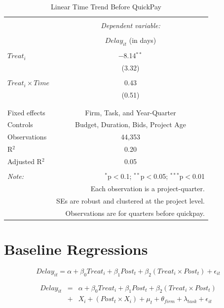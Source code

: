 \documentclass[
]{article}
\begin{document}
\begin{table}[H] \centering 
  \caption{Linear Time Trend Before QuickPay} 
  \label{} 
\small 
\begin{tabular}{@{\extracolsep{5pt}}lc} 
\\[-1.8ex]\hline 
\hline \\[-1.8ex] 
 & \multicolumn{1}{c}{\textit{Dependent variable:}} \\ 
\cline{2-2} 
\\[-1.8ex] & $Delay_{it}$ (in days) \\ 
\hline \\[-1.8ex] 
 $Treat_i$ & $-$8.14$^{**}$ \\ 
  & (3.32) \\ 
  & \\ 
 $Treat_i \times Time$ & 0.43 \\ 
  & (0.51) \\ 
  & \\ 
\hline \\[-1.8ex] 
Fixed effects & Firm, Task, and Year-Quarter \\ 
Controls & Budget, Duration, Bids, Project Age \\ 
Observations & 44,353 \\ 
R$^{2}$ & 0.20 \\ 
Adjusted R$^{2}$ & 0.05 \\ 
\hline 
\hline \\[-1.8ex] 
\textit{Note:}  & \multicolumn{1}{r}{$^{*}$p$<$0.1; $^{**}$p$<$0.05; $^{***}$p$<$0.01} \\ 
 & \multicolumn{1}{r}{Each observation is a project-quarter.} \\ 
 & \multicolumn{1}{r}{SEs are robust and clustered at the project level.} \\ 
 & \multicolumn{1}{r}{Observations are for quarters before quickpay.} \\ 
\end{tabular} 
\end{table}

\hypertarget{baseline-regressions}{%
\section{Baseline Regressions}\label{baseline-regressions}}

\[ Delay_{it} = \alpha+\beta_0 Treat_i + \beta_1 Post_t + \beta_2 (Treat_i \times Post_t) + \epsilon_{it}\]

\[ \begin{aligned} Delay_{it} &=& \alpha+\beta_0 Treat_i + \beta_1 Post_t + \beta_2 (Treat_i \times Post_t)\\
&+&  X_i + (Post_t \times X_i) + \mu_t + \theta_{firm} + \lambda_{task}+ \epsilon_{it}
\end{aligned}\]
\end{document}
